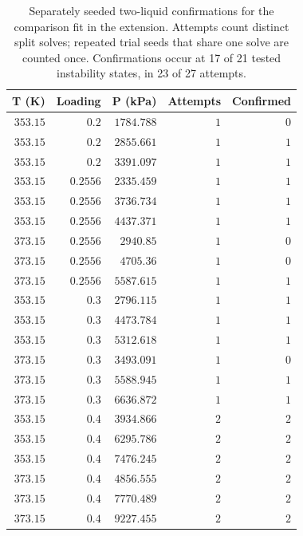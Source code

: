 \begin{table}[!htbp]\small\setlength{\tabcolsep}{3pt}\centering
\caption{Separately seeded two-liquid confirmations for the comparison fit in the extension. Attempts count distinct split solves; repeated trial seeds that share one solve are counted once. Confirmations occur at 17 of 21 tested instability states, in 23 of 27 attempts.}\label{tab:phase-extension-confirmations}
\begin{tabular}{@{}rrrrr@{}}
\toprule
T (K) & Loading & P (kPa) & Attempts & Confirmed \\
\midrule
$353.15$ & $0.2$ & $1784.788$ & $1$ & $0$ \\
$353.15$ & $0.2$ & $2855.661$ & $1$ & $1$ \\
$353.15$ & $0.2$ & $3391.097$ & $1$ & $1$ \\
$353.15$ & $0.2556$ & $2335.459$ & $1$ & $1$ \\
$353.15$ & $0.2556$ & $3736.734$ & $1$ & $1$ \\
$353.15$ & $0.2556$ & $4437.371$ & $1$ & $1$ \\
$373.15$ & $0.2556$ & $2940.85$ & $1$ & $0$ \\
$373.15$ & $0.2556$ & $4705.36$ & $1$ & $0$ \\
$373.15$ & $0.2556$ & $5587.615$ & $1$ & $1$ \\
$353.15$ & $0.3$ & $2796.115$ & $1$ & $1$ \\
$353.15$ & $0.3$ & $4473.784$ & $1$ & $1$ \\
$353.15$ & $0.3$ & $5312.618$ & $1$ & $1$ \\
$373.15$ & $0.3$ & $3493.091$ & $1$ & $0$ \\
$373.15$ & $0.3$ & $5588.945$ & $1$ & $1$ \\
$373.15$ & $0.3$ & $6636.872$ & $1$ & $1$ \\
$353.15$ & $0.4$ & $3934.866$ & $2$ & $2$ \\
$353.15$ & $0.4$ & $6295.786$ & $2$ & $2$ \\
$353.15$ & $0.4$ & $7476.245$ & $2$ & $2$ \\
$373.15$ & $0.4$ & $4856.555$ & $2$ & $2$ \\
$373.15$ & $0.4$ & $7770.489$ & $2$ & $2$ \\
$373.15$ & $0.4$ & $9227.455$ & $2$ & $2$ \\
\bottomrule
\end{tabular}
\end{table}
